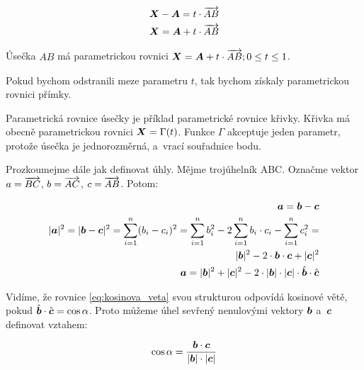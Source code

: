 \begin{equation}
\begin{split}
\boldsymbol{X} - \boldsymbol{A} = t \cdot \overrightarrow{AB} \\
\boldsymbol{X} = \boldsymbol{A} + t \cdot \overrightarrow{AB}
\end{split}
\end{equation}

\begin{fact}
Úsečka \(AB\) má parametrickou rovnici \(\boldsymbol{X} = \boldsymbol{A} + t \cdot \overrightarrow{AB}; 0 \leq t \leq 1\).
\end{fact}

Pokud bychom odstranili meze parametru \(t\), tak bychom získaly parametrickou rovnici přímky.

Parametrická rovnice úsečky je příklad parametrické rovnice křivky. Křivka má obecně parametrickou rovnici \(\boldsymbol{X} = \Gamma(t)\). Funkce \(\Gamma\) akceptuje jeden parametr, protože úsečka je jednorozměrná, a~vrací souřadnice bodu.

Prozkoumejme dále jak definovat úhly. Mějme trojúhelník ABC. Označme vektor \(a = \overrightarrow{BC}\), \(b = \overrightarrow{AC}\), \(c = \overrightarrow{AB}\). Potom:

\begin{equation}
\label{eq:kosinova_veta}
\begin{split}
\boldsymbol{a} = \boldsymbol{b} - \boldsymbol{c} \\
|\boldsymbol{a}|^2 = |\boldsymbol{b} - \boldsymbol{c}|^2 = \sum_{i=1}^{n} (b_i - c_i)^2 = \sum_{i=1}^{n} b_i^2 - 2 \sum_{i=1}^{n} b_i \cdot c_i - \sum_{i=1}^{n} c_i^2 = \\
|\boldsymbol{b}|^2 - 2 \cdot \boldsymbol{b} \cdot \boldsymbol{c} + |\boldsymbol{c}|^2 \\
\boldsymbol{a} = |\boldsymbol{b}|^2 + |\boldsymbol{c}|^2 - 2 \cdot |\boldsymbol{b}| \cdot |\boldsymbol{c}| \cdot \hat{\boldsymbol{b}} \cdot \hat{\boldsymbol{c}}
\end{split}
\end{equation}

Vidíme, že rovnice \eqref{eq:kosinova_veta} svou strukturou odpovídá kosinové větě, pokud \(\hat{\boldsymbol{b}} \cdot \hat{\boldsymbol{c}} = \cos \alpha\). Proto můžeme úhel sevřený nenulovými vektory \(\boldsymbol{b}\) a~\(\boldsymbol{c}\) definovat vztahem:

\begin{fact}
\begin{equation}
\cos \alpha = \frac{\boldsymbol{b} \cdot \boldsymbol{c}}{|\boldsymbol{b}| \cdot |\boldsymbol{c}|}
\end{equation}
\end{fact}

